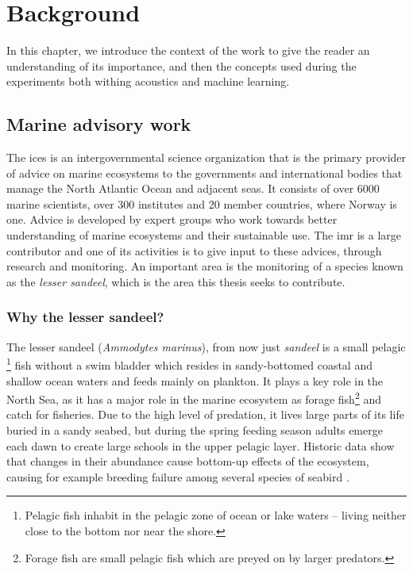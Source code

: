 \chapter{Background}
    In this chapter, we introduce the context of the work to give the reader an understanding of its importance, and then the concepts used during the experiments both withing acoustics and machine learning.
    
    
\section{Marine advisory work}
    The \gls{ices} is an intergovernmental science organization that is the primary provider of advice on marine ecosystems to the governments and international bodies that manage the North Atlantic Ocean and adjacent seas\cite{ICES2020}. It consists of over 6000 marine scientists, over 300 institutes and 20 member countries, where Norway is one. Advice is developed by expert groups who work towards better understanding of marine ecosystems and their sustainable use. The \gls{imr} is a large contributor and one of its activities is to give input to these advices, through research and monitoring. An important area is the monitoring of a species known as the \textit{lesser sandeel}, which is the area this thesis seeks to contribute.
    
\subsection{Why the lesser sandeel?}
    The lesser sandeel (\textit{Ammodytes marinus}), from now just \textit{sandeel} is
    a small pelagic \footnote{Pelagic fish inhabit in the pelagic zone of ocean or lake waters – living neither close to the bottom nor near the shore.} fish without a swim bladder which resides in sandy-bottomed coastal and shallow ocean waters and feeds mainly on plankton. It plays a key role in the North Sea, as it has a major role in the marine ecosystem as forage fish\footnote{Forage fish are small pelagic fish which are preyed on by larger predators.} and catch for fisheries. Due to the high level of predation, it lives large parts of its life buried in a sandy seabed, but during the spring feeding season adults emerge each dawn to create large schools in the upper pelagic layer. Historic data show that changes in their abundance cause bottom-up effects of the ecosystem, causing for example breeding failure among several species of seabird \cite{johnsen2017collective}. 
    
